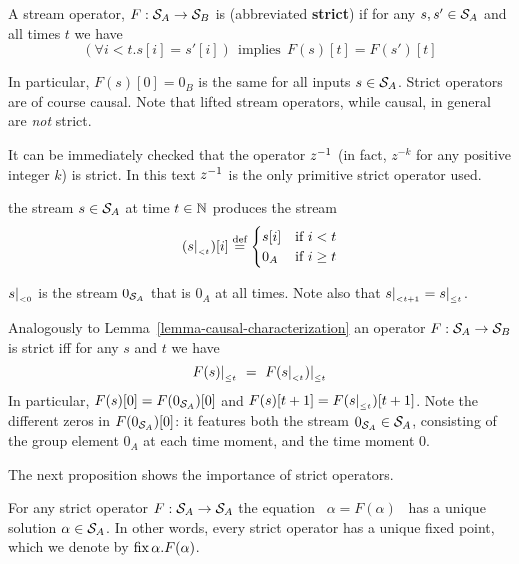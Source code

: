 \begin{definition}[Strictness]
A stream operator, $F:\mathcal{S}_{A}\to\mathcal{S}_{B}$
is  (abbreviated \textbf{strict})
if for any $s,s'\in\mathcal{S}_{A}$ and all times $t$ we have 
$$
(\forall i<t . s[i]=s'[i]) ~~\text{implies}~~ F(s)[t]=F(s')[t]
$$
\end{definition}

In particular, $F(s)[0] = 0_B$ is the same for all inputs $s \in \mathcal{S}_{A}$.
Strict operators are of course causal. Note that lifted stream operators,
while causal, in general are \emph{not} strict. 

It can be immediately checked that the operator $z^{-1}$ 
(in fact, $z^{-k}$ for any positive integer $k$)  
is strict. 
In this text $z^{-1}$ is the only primitive strict operator used.

\begin{definition}
 the stream $s \in \mathcal{S}_{A}$ at time $t \in \mathbb{N}$ produces the stream
$$
(s|_{_{< t}})[i] \stackrel{\textrm{\scriptsize def}}{=}  \begin{cases}
                      s[i] &\text{if}~i< t\\
                      0_A  &\text{if}~i\geq t
                      \end{cases}
$$
\end{definition}

$s|_{_{< 0}}$ is the stream $0_{\mathcal{S}_{A}}$ that is $0_A$ at all times.
Note also that $s|_{_{< t+1}} =s|_{_{\leq t}}$.


Analogously to Lemma~\ref{lemma-causal-characterization} an operator $F: \mathcal{S}_{A} \to \mathcal{S}_{B}$ is strict iff for any $s$ and $t$ we have
$$
F(s)|_{_{\leq t}} ~=~ F(s|_{_{< t}})|_{_{\leq t}}
$$
In particular, $F(s)[0] = F(0_{\mathcal{S}_{A}})[0]$ and
$F(s)[t+1]=F(s|_{_{\leq t}})[t+1]$.  Note the different zeros in $F(0_{\mathcal{S}_{A}})[0]$: 
it features both the stream $0_{\mathcal{S}_{A}} \in \mathcal{S}_{A}$, consisting of the group element $0_A$ 
at each time moment, and the time moment $0$.

The next proposition shows the importance of strict operators.
\begin{proposition}
\label{prop-unique-fix}
For any strict operator $F: \mathcal{S}_{A} \to \mathcal{S}_{A}$ the equation ~$\alpha=F(\alpha)$~ has a unique
solution $\alpha \in \mathcal{S}_{A}$.  In other words, every strict operator has a unique fixed point,
which we denote by $\mbox{fix}\,\alpha.F(\alpha)$.
\end{proposition}

